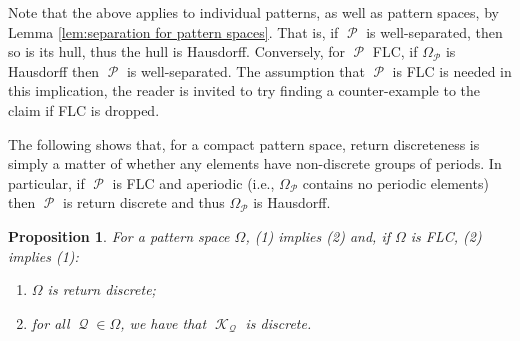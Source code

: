 \documentclass[11pt]{amsart}
\numberwithin{equation}{section}
\theoremstyle{plain}
\newtheorem{proposition}[theorem]{Proposition}
\theoremstyle{definition}
\DeclareMathOperator{\cP}{\mathcal{P}}
\DeclareMathOperator{\cQ}{\mathcal{Q}}
\DeclareMathOperator{\cK}{\mathcal{K}}
\begin{document}
Note that the above applies to individual patterns, as well as pattern spaces, by Lemma \ref{lem:separation for pattern spaces}. That is, if \(\cP\) is well-separated, then so is its hull, thus the hull is Hausdorff. Conversely, for \(\cP\) FLC, if \(\Omega_{\cP}\) is Hausdorff then \(\cP\) is well-separated. The assumption that \(\cP\) is FLC is needed in this implication, the reader is invited to try finding a counter-example to the claim if FLC is dropped.

The following shows that, for a compact pattern space, return discreteness is simply a matter of whether any elements have non-discrete groups of periods. In particular, if \(\cP\) is FLC and aperiodic (i.e., \(\Omega_{\cP}\) contains no periodic elements) then \(\cP\) is return discrete and thus \(\Omega_{\cP}\) is Hausdorff.

\begin{proposition}\label{prop:return discrete from discrete periods}
For a pattern space \(\Omega\), (1) implies (2) and, if \(\Omega\) is FLC, (2) implies (1):
\begin{enumerate}
	\item \(\Omega\) is return discrete;
	\item for all \(\cQ \in \Omega\), we have that \(\cK_{\cQ}\) is discrete.
\end{enumerate}
\end{proposition}
\end{document}
